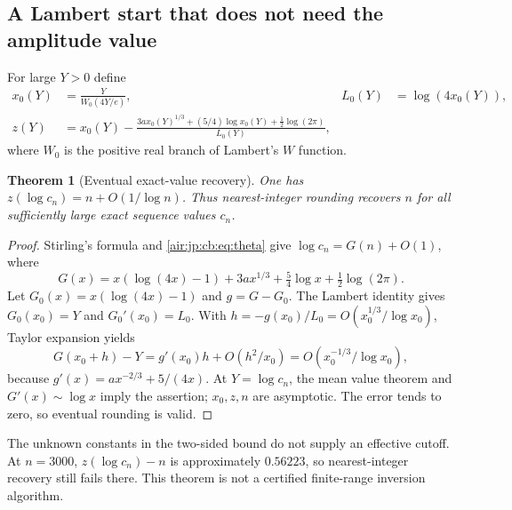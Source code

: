 \documentclass[11pt,letterpaper]{article}
\numberwithin{equation}{section}
\newtheorem{theorem}{Theorem}[section]
\theoremstyle{remark}
\begin{document}
\subsection{A Lambert start that does not need the amplitude value}
For large $Y>0$ define
\begin{align}
 x_0(Y)&=\frac{Y}{W_0(4Y/e)},&L_0(Y)&=\log(4x_0(Y)),\label{air:jp:cb:eq:lambert}\\
 z(Y)&=x_0(Y)-\frac{3ax_0(Y)^{1/3}+(5/4)\log x_0(Y)+\tfrac12\log(2\pi)}{L_0(Y)},\label{air:jp:cb:eq:z}
\end{align}
where $W_0$ is the positive real branch of Lambert's $W$ function.
\begin{theorem}[Eventual exact-value recovery]\label{air:jp:cb:thm:inverse}
One has $z(\log c_n)=n+O(1/\log n)$. Thus nearest-integer rounding recovers $n$ for all sufficiently large exact sequence values $c_n$.
\end{theorem}
\begin{proof}
Stirling's formula and \eqref{air:jp:cb:eq:theta} give $\log c_n=G(n)+O(1)$, where
\[
 G(x)=x(\log(4x)-1)+3ax^{1/3}+\tfrac54\log x+\tfrac12\log(2\pi).
\]
Let $G_0(x)=x(\log(4x)-1)$ and $g=G-G_0$. The Lambert identity gives $G_0(x_0)=Y$ and $G_0'(x_0)=L_0$. With $h=-g(x_0)/L_0=O(x_0^{1/3}/\log x_0)$, Taylor expansion yields
\[
 G(x_0+h)-Y=g'(x_0)h+O(h^2/x_0)=O(x_0^{-1/3}/\log x_0),
\]
because $g'(x)=ax^{-2/3}+5/(4x)$. At $Y=\log c_n$, the mean value theorem and $G'(x)\sim\log x$ imply the assertion; $x_0,z,n$ are asymptotic. The error tends to zero, so eventual rounding is valid.
\end{proof}
The unknown constants in the two-sided bound do not supply an effective cutoff. At $n=3000$, $z(\log c_n)-n$ is approximately $0.56223$, so nearest-integer recovery still fails there. This theorem is not a certified finite-range inversion algorithm.
\end{document}
